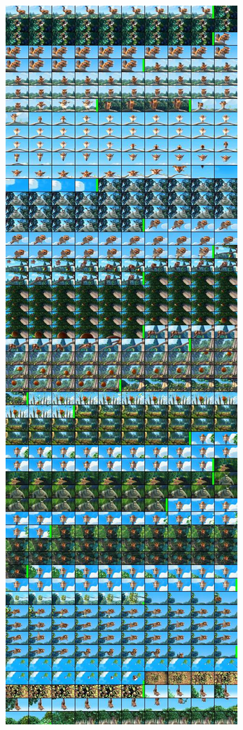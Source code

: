 \begin{figure}[h]
    \centering
    \includegraphics[align=c,width=.49\textwidth]{img/pred_transnetv1.jpg}

\end{figure}
